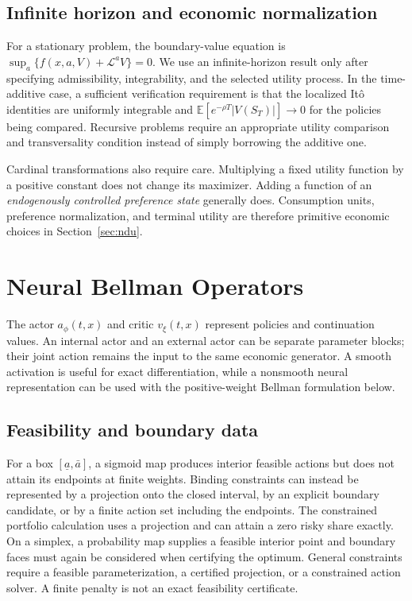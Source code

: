 \documentclass[ecta,nameyear,draft]{econsocart}
\theoremstyle{definition}
\theoremstyle{remark}
\newcommand{\E}{\mathbb E}
\newcommand{\LL}{\mathcal L}
\begin{document}
\subsection{Infinite horizon and economic normalization}
For a stationary problem, the boundary-value equation is $\sup_a\{f(x,a,V)+\LL^aV\}=0$. We use an infinite-horizon result only after specifying admissibility, integrability, and the selected utility process. In the time-additive case, a sufficient verification requirement is that the localized It\^o identities are uniformly integrable and $\E[e^{-\rho T}|V(S_T)|]\to0$ for the policies being compared. Recursive problems require an appropriate utility comparison and transversality condition instead of simply borrowing the additive one.

Cardinal transformations also require care. Multiplying a fixed utility function by a positive constant does not change its maximizer. Adding a function of an \emph{endogenously controlled preference state} generally does. Consumption units, preference normalization, and terminal utility are therefore primitive economic choices in Section~\ref{sec:ndu}.

\section{Neural Bellman Operators}\label{sec:method}
The actor $a_\phi(t,x)$ and critic $v_\xi(t,x)$ represent policies and continuation values. An internal actor and an external actor can be separate parameter blocks; their joint action remains the input to the same economic generator. A smooth activation is useful for exact differentiation, while a nonsmooth neural representation can be used with the positive-weight Bellman formulation below.

\subsection{Feasibility and boundary data}
For a box $[\underline a,\bar a]$, a sigmoid map produces interior feasible actions but does not attain its endpoints at finite weights. Binding constraints can instead be represented by a projection onto the closed interval, by an explicit boundary candidate, or by a finite action set including the endpoints. The constrained portfolio calculation uses a projection and can attain a zero risky share exactly. On a simplex, a probability map supplies a feasible interior point and boundary faces must again be considered when certifying the optimum. General constraints require a feasible parameterization, a certified projection, or a constrained action solver. A finite penalty is not an exact feasibility certificate.
\end{document}
